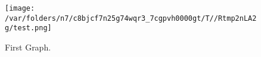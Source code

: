 
\begin{figure}[htbp]
   \centering
   \texttt{[image: /var/folders/n7/c8bjcf7n25g74wqr3\_7cgpvh0000gt/T//Rtmp2nLA2g/test.png]} %
   \caption{First Graph.}
   \label{fig:/var/folders/n7/c8bjcf7n25g74wqr3_7cgpvh0000gt/T//Rtmp2nLA2g/test.}
\end{figure}

